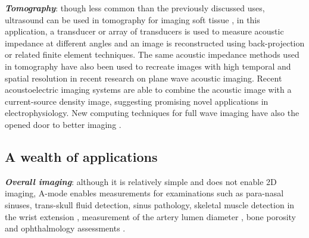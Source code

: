 \documentclass{article}
\begin{document}
\textbf{\textit{Tomography}}: though less common than the previously discussed uses, ultrasound can be used in tomography for imaging soft tissue \cite{zhang_design_2015, duric_detection_2007, wen_design_2019, ashfaq_new_2004}, in this application, a transducer or array of transducers is used to measure acoustic impedance at different angles and an image is reconstructed using back-projection or related finite element techniques. The same acoustic impedance methods used in tomography have also been used to recreate images with high temporal and spatial resolution in recent research on plane wave acoustic imaging\cite{Rabut2019,Warner2013}. Recent acoustoelectric imaging systems are able to combine the acoustic image with a current-source density image, suggesting promising novel applications in electrophysiology\cite{Xi2009, Qin2017}. New computing techniques for full wave imaging have also the opened door to better imaging \cite{guasch_full-waveform_2020, rymarczyk_logistic_2019}. 

\subsection{A wealth of applications}

\textbf{\textit{Overall imaging}}: although it is relatively simple and does not enable 2D imaging, A-mode enables 
measurements for examinations such as para-nasal sinuses, trans-skull fluid detection, sinus pathology, skeletal muscle detection in the wrist extension \cite{noauthor_wrist_nodate}, measurement of the artery lumen diameter \cite{hu_design_2011, zhang_multi-channel_2017, shomaji_early_2019}, bone porosity \cite{wahab_design_2016, fontes-pereira_monitoring_2018, grasel_characterization_2017} and ophthalmology assessments \cite{carotenuto_very_2004}.
\end{document}
